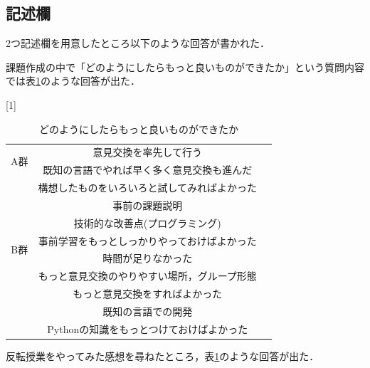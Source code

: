 \documentclass[a4j,11pt]{jsarticle}
\begin{document}
\newpage
\subsection{記述欄}
2つ記述欄を用意したところ以下のような回答が書かれた．

課題作成の中で「どのようにしたらもっと良いものができたか」という質問内容では表\ref{anke18}のような回答が出た．

\begin{table}[htbp]
\begin{center}
\caption{どのようにしたらもっと良いものができたか}
\scalebox{1}[1]{
\begin{tabular}{|c|c|c|}
\cline{1-2}
\multicolumn{1}{|c|}{\multirow{2}{*}{A群}} & 意見交換を率先して行う   \\ \cline{2-2}  
\multicolumn{1}{|c|}{} &  既知の言語でやれば早く多く意見交換も進んだ \\ \cline{2-2}  
\multicolumn{1}{|c|}{} &  構想したものをいろいろと試してみればよかった \\ \cline{2-2}  
\multicolumn{1}{|c|}{} &  事前の課題説明 \\ \cline{2-2} 
\multicolumn{1}{|c|}{} &  技術的な改善点(プログラミング) \\ \cline{1-2} 
 \multicolumn{1}{|c|}{\multirow{2}{*}{B群}} & 事前学習をもっとしっかりやっておけばよかった  \\ \cline{2-2}  
\multicolumn{1}{|c|}{} & 時間が足りなかった  \\ \cline{2-2}  
\multicolumn{1}{|c|}{} & もっと意見交換のやりやすい場所，グループ形態 \\ \cline{2-2}  
\multicolumn{1}{|c|}{} & もっと意見交換をすればよかった  \\ \cline{2-2}  
\multicolumn{1}{|c|}{} & 既知の言語での開発  \\ \cline{2-2}  
\multicolumn{1}{|c|}{} & Pythonの知識をもっとつけておけばよかった  \\ \cline{1-2}  
\end{tabular}
}
\label{anke18}
\end{center}
\end{table}

反転授業をやってみた感想を尋ねたところ，表\ref{anke18}のような回答が出た．
\end{document}
